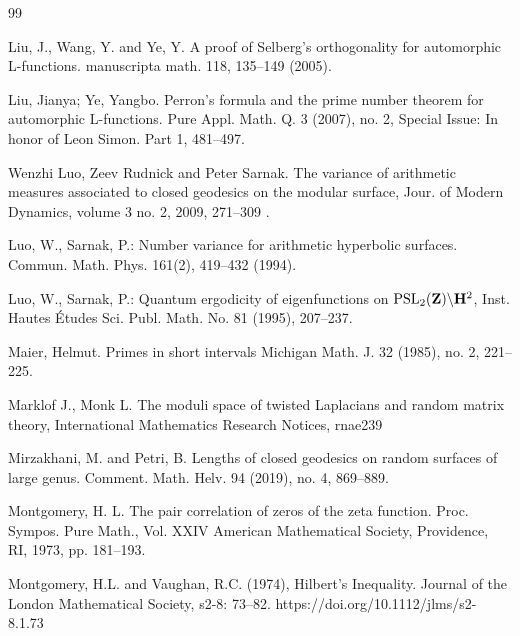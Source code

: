 \documentclass[12pt]{amsart}
\begin{document}
\begin{thebibliography}{99}

Liu, J., Wang, Y. and  Ye, Y. A proof of Selberg's orthogonality for automorphic L-functions. manuscripta math. 118, 135--149 (2005). 

Liu, Jianya; Ye, Yangbo. 
Perron's formula and the prime number theorem for automorphic L-functions. 
Pure Appl. Math. Q. 3 (2007), no. 2, Special Issue: In honor of Leon Simon. Part 1, 481--497.

Wenzhi Luo, Zeev Rudnick and Peter Sarnak. 
The variance of arithmetic measures associated to closed geodesics on the modular surface, Jour. of Modern Dynamics, volume 3 no. 2, 2009, 271--309 .

Luo, W., Sarnak, P.: Number variance for arithmetic hyperbolic surfaces. Commun. Math. Phys. 161(2), 419--432 (1994).


Luo, W., Sarnak, P.: Quantum ergodicity of eigenfunctions on  ${\rm PSL}_2(\bold Z)\backslash \bold H^2$,
    Inst. Hautes \'Etudes Sci. Publ. Math.
No. 81 (1995), 207--237.

Maier, Helmut. 
 Primes in short intervals
Michigan Math. J. 32 (1985), no. 2, 221--225.

	Marklof J., Monk L.
The moduli space of twisted Laplacians and random matrix theory, International Mathematics Research Notices, rnae239

 Mirzakhani, M. and Petri, B.   
Lengths of closed geodesics on random surfaces of large genus. 
Comment. Math. Helv. 94 (2019), no. 4, 869--889.


 Montgomery, H. L. 
The pair correlation of zeros of the zeta function. 
Proc. Sympos. Pure Math., Vol. XXIV
American Mathematical Society, Providence, RI, 1973, pp. 181--193.


Montgomery, H.L. and Vaughan, R.C. (1974), Hilbert's Inequality. Journal of the London Mathematical Society, s2-8: 73--82. https://doi.org/10.1112/jlms/s2-8.1.73


\end{thebibliography}
\end{document}
